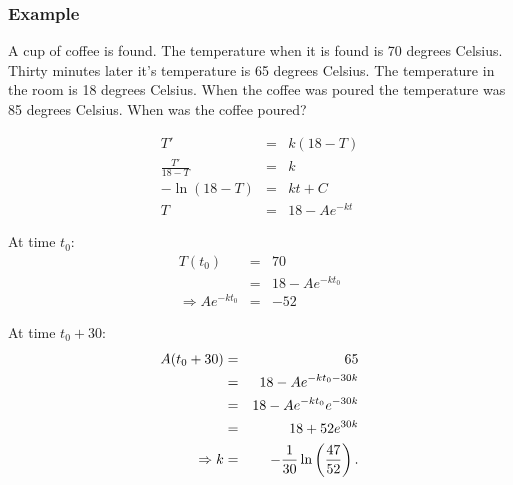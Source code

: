 \begin{frame}
  \frametitle{Example}

  A cup of coffee is found. The temperature when it is found is 70
  degrees Celsius. Thirty minutes later it's temperature is 65 degrees
  Celsius. The temperature in the room is 18 degrees Celsius. When the
  coffee was poured the temperature was 85 degrees Celsius. When was
  the coffee poured?


\end{frame}


\begin{frame}

  \begin{eqnarray*}
    T' & = & k(18-T) \\
    \frac{T'}{18-T} & = & k \\
    -\ln(18-T) & = & kt + C \\
    T & = & 18 - A e^{-kt} 
  \end{eqnarray*}

\end{frame}

\begin{frame}

  At time $t_0$:
  \begin{eqnarray*}
    T(t_0) & = & 70 \\
    & = & 18 - Ae^{-kt_0} \\
    \Rightarrow Ae^{-kt_0} & = & -52
  \end{eqnarray*}

  At time $t_0+30$:
  \begin{eqnarray*}
    A(t_0+30) & = & 65 \\
    & = & 18 - A e^{-kt_0-30k} \\
    & = & 18 - A e^{-kt_0} e^{-30k} \\
    & = & 18 + 52 e^{30k} \\
    \Rightarrow k & = & -\frac{1}{30} \ln\left(\frac{47}{52}\right).
  \end{eqnarray*}

\end{frame}


